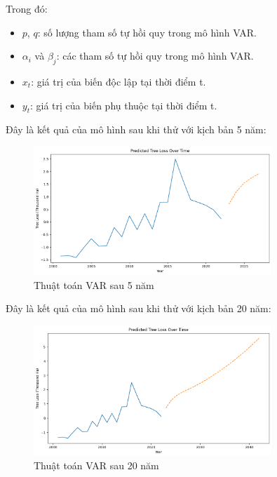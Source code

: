 \documentclass[a4paper,12pt]{report}
\begin{document}
\begin{flushleft}
	Trong đó:
	\begin{itemize}
		\item $p$, $q$: số lượng tham số tự hồi quy trong mô hình VAR.

		\item $\alpha_{i}$ và $\beta_{j}$: các tham số tự hồi quy trong mô hình VAR.

		\item $x_{t}$: giá trị của biến độc lập tại thời điểm t.

		\item $y_{t}$: giá trị của biến phụ thuộc tại thời điểm t.
	\end{itemize}

	Đây là kết quả của mô hình sau khi thử với kịch bản 5 năm:
	\begin{figure}[H]
		\centering
		\includegraphics[width = 0.8\textwidth]{images/VAR_5.png}
		\caption{Thuật toán VAR sau 5 năm}
	\end{figure}

	Đây là kết quả của mô hình sau khi thử với kịch bản 20 năm:
	\begin{figure}[H]
		\centering
		\includegraphics[width = 0.8\textwidth]{images/VAR_20.png}
		\caption{Thuật toán VAR sau 20 năm}
	\end{figure}
\end{flushleft}
\end{document}
